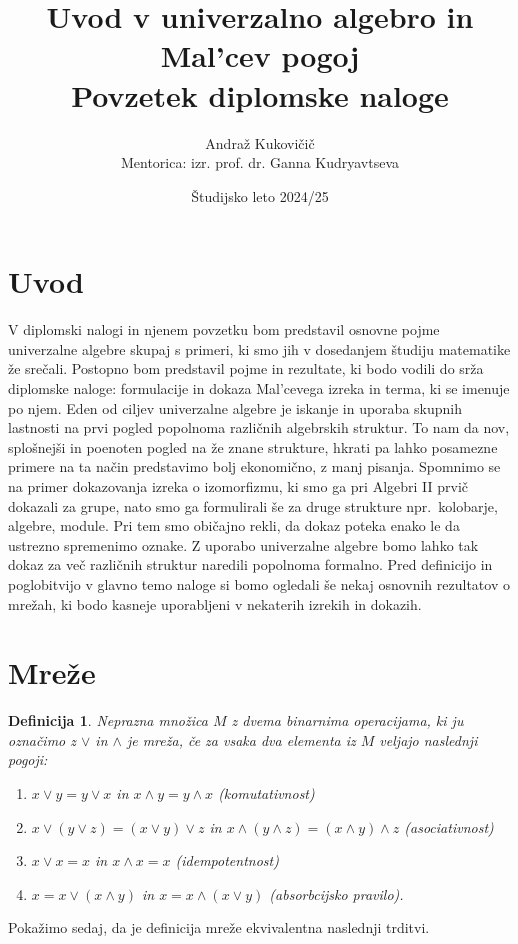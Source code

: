 \documentclass[a4paper,11pt]{article}
\title{Uvod v univerzalno algebro in Mal'cev pogoj \\ 
\Large Povzetek diplomske naloge}
\author{Andraž Kukovičič \\
Mentorica: izr. prof. dr. Ganna Kudryavtseva}
\date{Študijsko leto 2024/25}
\newtheorem{definicija}{Definicija}
\begin{document}


\maketitle

\section{Uvod}
V diplomski nalogi in njenem povzetku bom predstavil osnovne pojme univerzalne algebre skupaj s primeri, 
ki smo jih v dosedanjem študiju matematike že srečali. 
Postopno bom predstavil pojme in rezultate, ki bodo vodili do srža diplomske naloge:
formulacije in dokaza Mal'cevega izreka in terma, ki se imenuje po njem.
Eden od ciljev univerzalne algebre je iskanje in uporaba skupnih lastnosti na prvi pogled popolnoma
različnih algebrskih struktur. To nam da nov, splošnejši in poenoten pogled na že znane strukture, hkrati pa lahko 
posamezne primere na ta način predstavimo bolj ekonomično, z manj pisanja. 
Spomnimo se na primer dokazovanja izreka o izomorfizmu, ki smo ga pri Algebri II prvič dokazali za grupe, nato 
smo ga formulirali še za druge strukture npr.\ kolobarje, algebre, module. Pri tem smo običajno rekli, da dokaz poteka 
enako le da ustrezno spremenimo oznake. Z uporabo univerzalne algebre bomo lahko tak dokaz za več različnih struktur 
naredili popolnoma formalno. 
Pred definicijo in poglobitvijo v glavno temo naloge si bomo ogledali še nekaj osnovnih rezultatov o mrežah, ki bodo 
kasneje uporabljeni v nekaterih izrekih in dokazih.

\section{Mreže}
\begin{definicija}
    Neprazna množica $M$ z dvema binarnima operacijama, ki ju označimo z $\vee$ in $\wedge$ je \emph{mreža}, če 
za vsaka dva elementa iz $M$ veljajo naslednji pogoji:\\
\begin{enumerate} 
    \item[$M1$] $x \vee y = y \vee x$ in $x \wedge y = y \wedge x$ (komutativnost)
    \item[$M2$] $x\vee \left(y \vee z\right) = \left(x \vee y\right)\vee z$ in 
    $x \wedge \left(y \wedge z\right) = \left(x \wedge y\right)\wedge z$ (asociativnost)
    \item[$M3$] $x \vee x = x$ in $x \wedge x = x$ (idempotentnost)
    \item[$M4$] $x = x \vee \left(x \wedge y\right)$ in $x = x \wedge \left(x \vee y\right)$ (absorbcijsko pravilo).\\
\end{enumerate}
\end{definicija}
Pokažimo sedaj, da je definicija mreže ekvivalentna naslednji trditvi.
\end{document}
